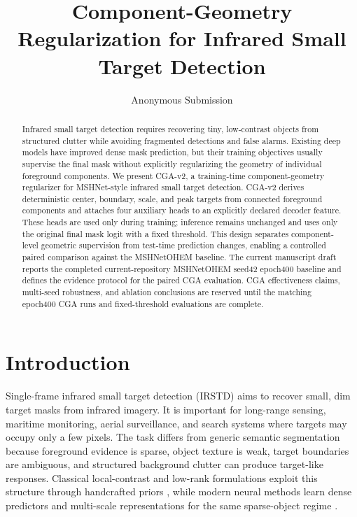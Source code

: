 \documentclass[letterpaper]{article}
\title{Component-Geometry Regularization for Infrared Small Target Detection}
\author{Anonymous Submission}
\begin{document}
\maketitle

\begin{abstract}
Infrared small target detection requires recovering tiny, low-contrast objects from structured clutter while avoiding fragmented detections and false alarms. Existing deep models have improved dense mask prediction, but their training objectives usually supervise the final mask without explicitly regularizing the geometry of individual foreground components. We present CGA-v2, a training-time component-geometry regularizer for MSHNet-style infrared small target detection. CGA-v2 derives deterministic center, boundary, scale, and peak targets from connected foreground components and attaches four auxiliary heads to an explicitly declared decoder feature. These heads are used only during training; inference remains unchanged and uses only the original final mask logit with a fixed threshold. This design separates component-level geometric supervision from test-time prediction changes, enabling a controlled paired comparison against the MSHNetOHEM baseline. The current manuscript draft reports the completed current-repository MSHNetOHEM seed42 epoch400 baseline and defines the evidence protocol for the paired CGA evaluation. CGA effectiveness claims, multi-seed robustness, and ablation conclusions are reserved until the matching epoch400 CGA runs and fixed-threshold evaluations are complete.
\end{abstract}

\section{Introduction}

Single-frame infrared small target detection (IRSTD) aims to recover small, dim target masks from infrared imagery. It is important for long-range sensing, maritime monitoring, aerial surveillance, and search systems where targets may occupy only a few pixels. The task differs from generic semantic segmentation because foreground evidence is sparse, object texture is weak, target boundaries are ambiguous, and structured background clutter can produce target-like responses. Classical local-contrast and low-rank formulations exploit this structure through handcrafted priors \citep{chen2014local,dai2017ript,zhang2019pstnn}, while modern neural methods learn dense predictors and multi-scale representations for the same sparse-object regime \citep{wang2019miss,dai2021acm,dai2021alcnet,li2023dnanet}.
\end{document}
